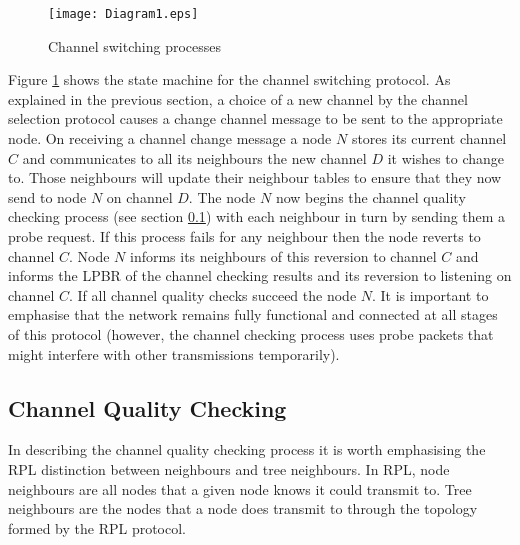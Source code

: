 

\begin{figure}
\centering
\texttt{[image: Diagram1.eps]}
\caption{Channel switching processes}
\label{fig_sim}
\end{figure}

Figure \ref{fig_sim} shows the state machine for the channel switching protocol.
As explained in the previous section, a choice of a new channel by the channel selection protocol causes a change channel message to be sent to the appropriate node. 
On receiving a channel change message a node $N$ stores its current channel $C$ and communicates to all its neighbours the new channel $D$ it wishes to change to.  Those neighbours will update their neighbour tables to ensure that they now send to node $N$ on channel $D$.  The node $N$ now begins the channel quality checking process (see section \ref{sec:channelquality}) with each neighbour in turn by sending them a probe request.  If this process fails for any neighbour then the node reverts to channel $C$.  Node $N$ informs its neighbours of this reversion to channel $C$ and informs the LPBR of the channel checking results and its reversion to listening on channel $C$. If all channel quality checks succeed the node $N$. It is important to emphasise that the network remains fully functional and connected at all stages of this protocol (however, the channel checking process uses probe packets that might interfere with other transmissions temporarily).

\subsection{Channel Quality Checking}
\label{sec:channelquality}

In describing the channel quality checking process it is worth emphasising the RPL distinction between neighbours and tree neighbours. In RPL, node neighbours are all nodes that a given node knows it could transmit to. Tree neighbours are the nodes that a node does transmit to through the topology formed by the RPL protocol.

